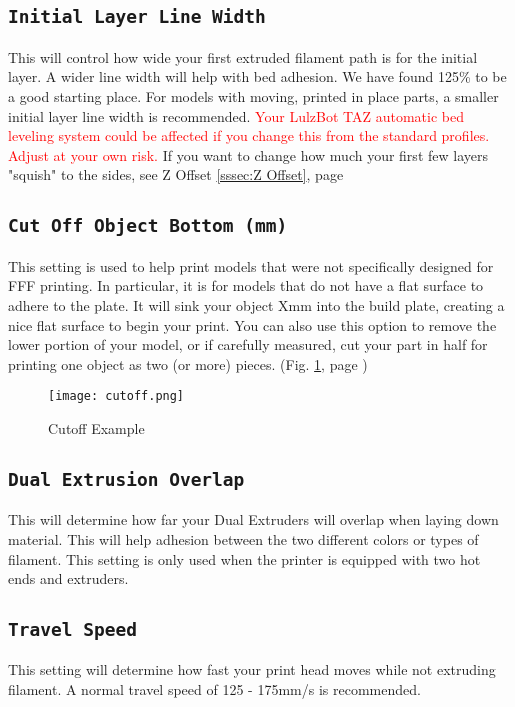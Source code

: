 \subsection{\texttt{Initial Layer Line Width}}
This will control how wide your first extruded filament path is for the initial layer. A wider line width will help with bed adhesion. We have found 125\% to be a good starting place. For models with moving, printed in place parts, a smaller initial layer line width is recommended. \textcolor{red}{Your LulzBot TAZ automatic bed leveling system could be affected if you change this from the standard profiles. Adjust at your own risk.} If you want to change how much your first few layers "squish" to the sides, see Z Offset \ref{sssec:Z Offset}, page \pageref{sssec:Z Offset} 

\subsection{\texttt{Cut Off Object Bottom (mm)}}
This setting is used to help print models that were not specifically designed for FFF printing. In particular, it is for models that do not have a flat surface to adhere to the plate. It will sink your object Xmm into the build plate, creating a nice flat surface to begin your print. You can also use this option to remove the lower portion of your model, or if carefully measured, cut your part in half for printing one object as two (or more) pieces. (Fig. \ref{fig:Cutoff Example}, page \pageref{fig:Cutoff Example})
\begin{figure}[H]
\centering
\texttt{[image: cutoff.png]}
\caption{Cutoff Example}
\label{fig:Cutoff Example}
\end{figure}

\subsection{\texttt{Dual Extrusion Overlap}}
This will determine how far your Dual Extruders will overlap when laying down material. This will help adhesion between the two different colors or types of filament. This setting is only used when the printer is equipped with two hot ends and extruders.

\subsection{\texttt{Travel Speed}}
This setting will determine how fast your print head moves while not extruding filament. A normal travel speed of 125 - 175mm/s is recommended.

